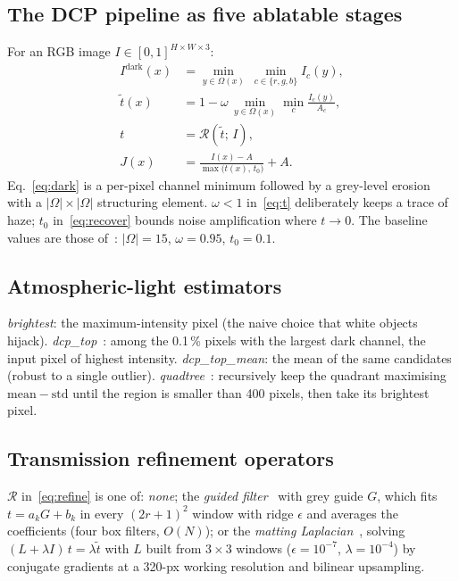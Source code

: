 \documentclass[conference]{IEEEtran}
\begin{document}
\subsection{The DCP pipeline as five ablatable stages}
For an RGB image $I\in[0,1]^{H\times W\times 3}$:
\begin{align}
  I^{\text{dark}}(x) &= \min_{y\in\Omega(x)}\ \min_{c\in\{r,g,b\}} I_c(y), \label{eq:dark}\\
  \tilde t(x) &= 1 - \omega\, \min_{y\in\Omega(x)}\min_c \frac{I_c(y)}{A_c}, \label{eq:t}\\
  t &= \mathcal{R}(\tilde t;\, I), \label{eq:refine}\\
  J(x) &= \frac{I(x)-A}{\max\bigl(t(x),\,t_0\bigr)} + A. \label{eq:recover}
\end{align}
Eq.~\eqref{eq:dark} is a per-pixel channel minimum followed by a grey-level erosion with a $|\Omega|\times|\Omega|$
structuring element. $\omega<1$ in~\eqref{eq:t} deliberately keeps a trace of haze; $t_0$ in~\eqref{eq:recover} bounds
noise amplification where $t\to0$. The baseline values are those of~\cite{he2011}: $|\Omega|=15$, $\omega=0.95$,
$t_0=0.1$.

\subsection{Atmospheric-light estimators}
\emph{brightest}: the maximum-intensity pixel (the naive choice that white objects hijack).
\emph{dcp\_top}~\cite{he2011}: among the 0.1\,\% pixels with the largest dark channel, the input pixel of highest intensity.
\emph{dcp\_top\_mean}: the mean of the same candidates (robust to a single outlier).
\emph{quadtree}~\cite{kim2013}: recursively keep the quadrant maximising $\mathrm{mean}-\mathrm{std}$ until the region is
smaller than 400 pixels, then take its brightest pixel.

\subsection{Transmission refinement operators}
$\mathcal{R}$ in~\eqref{eq:refine} is one of: \emph{none}; the \emph{guided filter}~\cite{he2010} with grey guide $G$,
which fits $t = a_k G + b_k$ in every $(2r{+}1)^2$ window with ridge $\epsilon$ and averages the coefficients (four box
filters, $O(N)$); or the \emph{matting Laplacian}~\cite{levin2008,he2009}, solving $(L+\lambda I)\,t = \lambda\tilde t$
with $L$ built from $3\times3$ windows ($\epsilon=10^{-7}$, $\lambda=10^{-4}$) by conjugate gradients at a 320-px working
resolution and bilinear upsampling.
\end{document}
